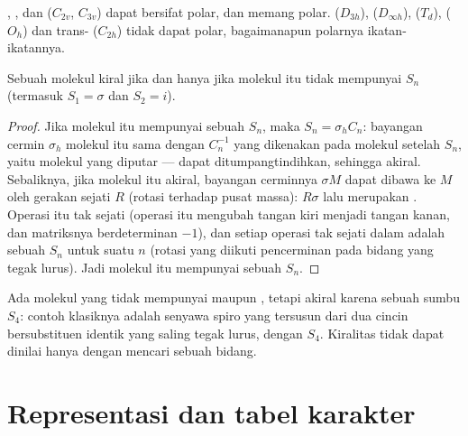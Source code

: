 \begin{example}\label{ex:b3:point-groups:polar}
, ,  dan  ($C_{2v}$, $C_{3v}$) dapat bersifat
polar, dan memang polar.  ($D_{3h}$),  ($D_{\infty h}$), 
($T_d$),  ($O_h$) dan trans- ($C_{2h}$) tidak dapat polar,
bagaimanapun polarnya ikatan-ikatannya.
\end{example}

\begin{theorem}\label{thm:b3:point-groups:chiral}
Sebuah molekul kiral jika dan hanya jika molekul itu tidak mempunyai  $S_n$ (termasuk $S_1 = \sigma$ dan $S_2 = i$).
\end{theorem}

\begin{proof}
Jika molekul itu mempunyai sebuah $S_n$, maka $S_n = \sigma_hC_n$: bayangan
cermin $\sigma_h$ molekul itu sama dengan $C_n^{-1}$ yang dikenakan pada
molekul setelah $S_n$, yaitu molekul yang diputar --- dapat ditumpangtindihkan,
sehingga akiral. Sebaliknya, jika molekul itu akiral, bayangan cerminnya
$\sigma M$ dapat dibawa ke $M$ oleh gerakan sejati $R$ (rotasi terhadap pusat
massa): $R\sigma$ lalu merupakan . Operasi itu tak sejati
(operasi itu mengubah tangan kiri menjadi tangan kanan, dan matriksnya
berdeterminan $-1$), dan
setiap operasi tak sejati dalam  adalah sebuah $S_n$ untuk suatu
$n$ (rotasi yang diikuti pencerminan pada bidang yang tegak lurus). Jadi
molekul itu mempunyai sebuah $S_n$.
\end{proof}

\begin{example}\label{ex:b3:point-groups:s4}
Ada molekul yang tidak mempunyai  maupun , tetapi
akiral karena sebuah sumbu $S_4$: contoh klasiknya adalah senyawa spiro yang
tersusun dari dua cincin bersubstituen identik yang saling tegak lurus,
dengan  $S_4$. Kiralitas tidak dapat dinilai hanya dengan mencari
sebuah bidang.
\end{example}

\section{Representasi dan tabel karakter}

